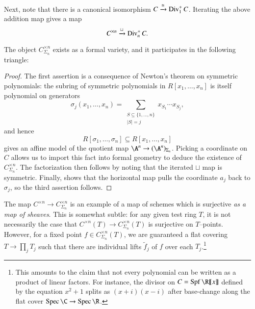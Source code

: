 Next, note that there is a canonical isomorphism $C \xrightarrow{\cong} \operatorname{Div}_1^+ C$.  Iterating the above addition map gives a map \[C^{\times n} \xrightarrow{\sqcup} \operatorname{Div}_n^+ C.\]
\begin{lemma}\label{SymmetricAffinesExist}
The object $C^{\times n}_{\Sigma_n}$ exists as a formal variety, and it participates in the following triangle:
\begin{center}
\end{center}
\end{lemma}
\begin{proof}
The first assertion is a consequence of Newton's theorem on symmetric polynomials: the subring of symmetric polynomials in $R[x_1, \ldots, x_n]$ is itself polynomial on generators \[\sigma_j(x_1, \ldots, x_n) = \sum_{\substack{S \subseteq \{1, \ldots, n\} \\ |S| = j}} x_{S_1} \cdots x_{S_j},\] and hence \[R[\sigma_1, \ldots, \sigma_n] \subseteq R[x_1, \ldots, x_n]\] gives an affine model of the quotient map $\A^n \to (\A^n)_{\Sigma_n}$.  Picking a coordinate on $C$ allows us to import this fact into formal geometry to deduce the existence of $C^{\times n}_{\Sigma_n}$.  The factorization then follows by noting that the iterated $\sqcup$ map is symmetric.  Finally,  shows that the horizontal map pulls the coordinate $a_j$ back to $\sigma_j$, so the third assertion follows.
\end{proof}

\begin{remark}
The map $C^{\times n} \to C^{\times n}_{\Sigma_n}$ is an example of a map of schemes which is surjective \emph{as a map of sheaves}.  This is somewhat subtle: for any given test ring $T$, it is not necessarily the case that $C^{\times n}(T) \to C^{\times n}_{\Sigma_n}(T)$ is surjective on $T$--points.  However, for a fixed point $f \in C^{\times n}_{\Sigma_n}(T)$, we are guaranteed a flat covering $T \to \prod_j T_j$ such that there are individual lifts $\widetilde f_j$ of $f$ over each $T_j$.\footnote{This amounts to the claim that not every polynomial can be written as a product of linear factors.  For instance, the divisor on $C = \Spf \R\ps{x}$ defined by the equation $x^2 + 1$ splits as $(x + i)(x - i)$ after base-change along the flat cover $\Spec \C \to \Spec \R$.}
\end{remark}

